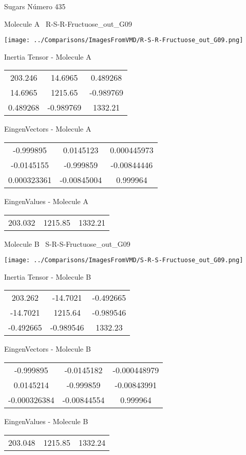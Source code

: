\vtab[-3cm]
\begin{center}
{\large Sugars \tab Número 435}
\end{center}
\begin{multicols}{2}
\begin{center}

Molecule A \
R-S-R-Fructuose\_out\_G09

\texttt{[image: ../Comparisons/ImagesFromVMD/R-S-R-Fructuose\_out\_G09.png]}

Inertia Tensor - Molecule A \\
\begin{tabular}{|c c c|}
203.246	 & 	14.6965	 & 	0.489268	 \\
14.6965	 & 	1215.65	 & 	-0.989769	 \\
0.489268	 & 	-0.989769	 & 	1332.21
\end{tabular}

\vtab
 EingenVectors - Molecule A     \\
\begin{tabular}{|c c c|}
-0.999895	 & 	0.0145123	 & 	0.000445973	 \\
-0.0145155	 & 	-0.999859	 & 	-0.00844446	 \\
0.000323361	 & 	-0.00845004	 & 	0.999964
\end{tabular}

\vtab
 EingenValues - Molecule A     \\
\begin{tabular}{|c c c|}
203.032	 & 	1215.85	 & 	1332.21	 \\
\end{tabular}
\columnbreak

Molecule B \
S-R-S-Fructuose\_out\_G09

\texttt{[image: ../Comparisons/ImagesFromVMD/S-R-S-Fructuose\_out\_G09.png]}

Inertia Tensor - Molecule B \\
\begin{tabular}{|c c c|}
203.262	 & 	-14.7021	 & 	-0.492665	 \\
-14.7021	 & 	1215.64	 & 	-0.989546	 \\
-0.492665	 & 	-0.989546	 & 	1332.23
\end{tabular}

\vtab
 EingenVectors - Molecule B     \\
\begin{tabular}{|c c c|}
-0.999895	 & 	-0.0145182	 & 	-0.000448979	 \\
0.0145214	 & 	-0.999859	 & 	-0.00843991	 \\
-0.000326384	 & 	-0.00844554	 & 	0.999964
\end{tabular}

\vtab
 EingenValues - Molecule B     \\
\begin{tabular}{|c c c|}
203.048	 & 	1215.85	 & 	1332.24	 \\
\end{tabular}

\end{center}
\end{multicols}


